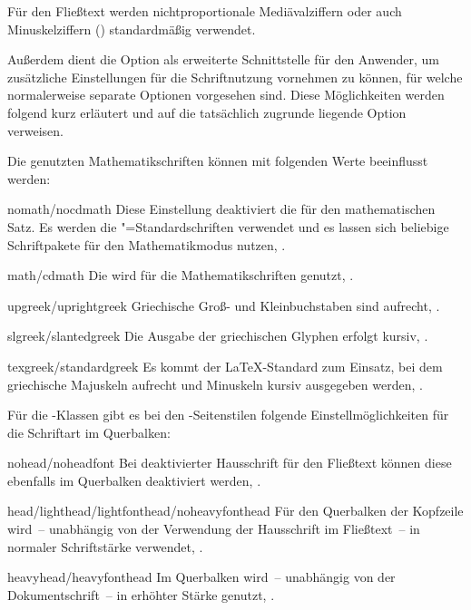 \begin{Declaration*}{}
\begin{Declaration*}{}
\begin{Declaration*}{}
\begin{Declaration}
\begin{values}{}
  Für den Fließtext werden nichtproportionale Mediävalziffern oder auch 
  Minuskelziffern (\textbf{}) standardmäßig verwendet.
\end{values}
%
Außerdem dient die Option  als erweiterte Schnittstelle 
für den Anwender, um zusätzliche Einstellungen für die Schriftnutzung vornehmen 
zu können, für welche normalerweise separate Optionen vorgesehen sind. Diese 
Möglichkeiten werden folgend kurz erläutert und auf die tatsächlich zugrunde 
liegende Option verweisen.

Die genutzten Mathematikschriften können mit folgenden Werte beeinflusst werden:
%
\begin{values}{}
\item[nomath/nocdmath] 
  Diese Einstellung deaktiviert die \OpenSans für den mathematischen Satz. Es 
  werden die "=Standardschriften verwendet und es lassen sich  
  beliebige Schriftpakete für den Mathematikmodus nutzen, 
  .
\item[math/cdmath]
  Die \OpenSans wird für die Mathematikschriften genutzt, 
  .
\item[upgreek/uprightgreek]
  Griechische Groß- und Kleinbuchstaben sind aufrecht, 
  .
\item[slgreek/slantedgreek]
  Die Ausgabe der griechischen Glyphen erfolgt kursiv, 
  .
\item[texgreek/standardgreek]
  Es kommt der \LaTeX-Standard zum Einsatz, bei dem griechische Majuskeln 
  aufrecht und Minuskeln kursiv ausgegeben werden, 
  .
\end{values}
%
Für die \TUDScript-Klassen gibt es bei den -Seitenstilen 
folgende Einstellmöglichkeiten für die Schriftart im Querbalken:
%
\begin{values}{}
\item[nohead/noheadfont]
  Bei deaktivierter Hausschrift für den Fließtext können diese ebenfalls im 
  Querbalken deaktiviert werden, .
\item[head/lighthead/lightfonthead/noheavyfonthead]
  Für den Querbalken der Kopfzeile wird~-- unabhängig von der Verwendung der 
  Hausschrift im Fließtext~-- \OpenSans in normaler Schriftstärke verwendet, 
  .
\item[heavyhead/heavyfonthead]
  Im Querbalken wird~-- unabhängig von der Dokumentschrift~-- \OpenSans in 
  erhöhter Stärke genutzt, .
\end{values}
\end{Declaration}


\end{Declaration*}
\end{Declaration*}
\end{Declaration*}
